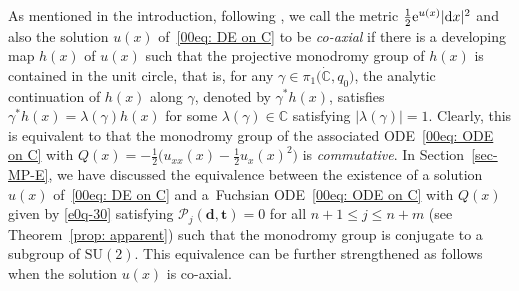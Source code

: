 \documentclass[pdftex]{sigma}
\numberwithin{equation}{section}
\def\C{\mathbb C}
\def\bt{\boldsymbol t}
\begin{document}
As mentioned in the introduction, following \cite{Mondello-Panov}, we
call the metric $\frac12{\rm e}^{u(x)}|{\rm d}x|^2$ and also the solution $u(x)$
of~\eqref{00eq: DE on C} to be \emph{co-axial} if there is a
developing map $h(x)$ of $u(x)$ such that the projective monodromy
group of $h(x)$ is contained in the unit circle, that is, for any
$\gamma\in \pi_1\bigl(\dot{\C}, q_0\bigr)$, the analytic continuation of $h(x)$
along $\gamma$, denoted by $\gamma^*h(x)$, satisfies
$\gamma^*h(x)=\lambda(\gamma)h(x)$ for some
$\lambda(\gamma)\in\mathbb{C}$ satisfying
$|\lambda(\gamma)|=1$. Clearly, this is equivalent to that the
monodromy group of the associated ODE~\eqref{00eq: ODE on C} with
$Q(x)=-\frac12\bigl(u_{xx}(x)-\frac12 u_x(x)^2\bigr)$ is \emph{commutative}. In
Section~\ref{sec-MP-E}, we have discussed the equivalence between the
existence of a solution $u(x)$ of~\eqref{00eq: DE on C}
and a~Fuchsian ODE~\eqref{00eq: ODE on C} with $Q(x)$ given by
\eqref{e0q-30} satisfying $\mathcal{P}_j(\boldsymbol{d},\bt)=0$ for
all $n+1\leq j\leq n+m$ (see Theorem~\ref{prop: apparent}) such that
the monodromy group is conjugate to a subgroup of
$\mathrm{SU}(2)$. This equivalence can be further strengthened as
follows when the solution $u(x)$ is co-axial.
\end{document}

